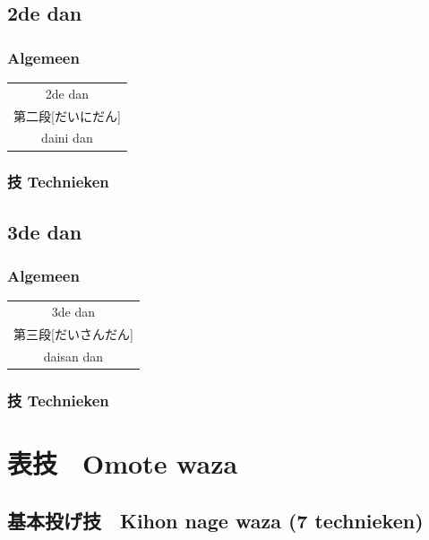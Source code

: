 \documentclass[12pt]{scrartcl}
\begin{document}
\begin{CJK*}{UTF8}{min}
\newpage
\subsection{2de dan}
\subsubsection{Algemeen}
\begin{table}[H]
\begin{center}
\begin{tabular}{c}
2de dan\\
第二段[だいにだん]\\
daini dan
\end{tabular}
\end{center}
\label{dan_2_gen}
\end{table}

\subsubsection{技 Technieken}

\newpage
\subsection{3de dan}
\subsubsection{Algemeen}
\begin{table}[H]
\begin{center}
\begin{tabular}{c}
3de dan\\
第三段[だいさんだん]\\
daisan dan
\end{tabular}
\end{center}
\label{dan_2_gen}
\end{table}

\subsubsection{技 Technieken}

\newpage
\section{表技　Omote waza}
\subsection{基本投げ技　Kihon nage waza (7 technieken)}


\end{CJK*}
\end{document}

